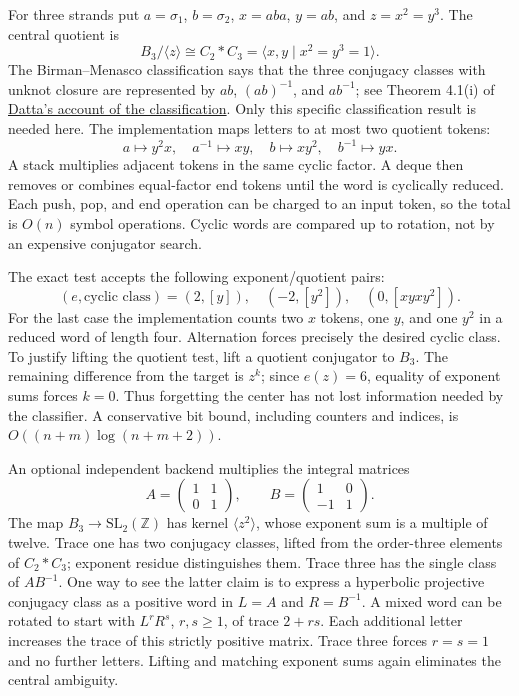 For three strands put $a=\sigma_1$, $b=\sigma_2$, $x=aba$, $y=ab$,
and $z=x^2=y^3$. The central quotient is
\[
 B_3/\langle z\rangle\cong C_2*C_3
   =\langle x,y\mid x^2=y^3=1\rangle.
\]
The Birman--Menasco classification says that the three conjugacy classes
with unknot closure are represented by $ab$, $(ab)^{-1}$, and $ab^{-1}$;
see Theorem 4.1(i) of
\href{https://arxiv.org/abs/2204.13660}{Datta's account of the classification}.
Only this specific classification result is needed here. The implementation
maps letters to at most two quotient tokens:
\[
 a\mapsto y^2x,\quad a^{-1}\mapsto xy,\quad
 b\mapsto xy^2,\quad b^{-1}\mapsto yx.
\]
A stack multiplies adjacent tokens in the same cyclic factor. A deque
then removes or combines equal-factor end tokens until the word is
cyclically reduced. Each push, pop, and end operation can be charged to
an input token, so the total is $O(n)$ symbol operations. Cyclic words
are compared up to rotation, not by an expensive conjugator search.

The exact test accepts the following exponent/quotient pairs:
\[
 (e,\text{cyclic class})=(2,[y]),\quad(-2,[y^2]),
 \quad(0,[xyxy^2]).
\]
For the last case the implementation counts two $x$ tokens, one $y$,
and one $y^2$ in a reduced word of length four. Alternation forces
precisely the desired cyclic class. To justify lifting the quotient
test, lift a quotient conjugator to $B_3$. The remaining difference
from the target is $z^k$; since $e(z)=6$, equality of exponent sums
forces $k=0$. Thus forgetting the center has not lost information
needed by the classifier. A conservative bit bound, including counters
and indices, is $O((n+m)\log(n+m+2))$.

An optional independent backend multiplies the integral matrices
\[
 A=\begin{pmatrix}1&1\\0&1\end{pmatrix},\qquad
 B=\begin{pmatrix}1&0\\-1&1\end{pmatrix}.
\]
The map $B_3\to\mathrm{SL}_2(\mathbb Z)$ has kernel
$\langle z^2\rangle$, whose exponent sum is a multiple of twelve.
Trace one has two conjugacy classes, lifted from the order-three
elements of $C_2*C_3$; exponent residue distinguishes them. Trace three
has the single class of $AB^{-1}$. One way to see the latter claim is
to express a hyperbolic projective conjugacy class as a positive word
in $L=A$ and $R=B^{-1}$. A mixed word can be rotated to start with
$L^rR^s$, $r,s\ge1$, of trace $2+rs$. Each additional letter increases
the trace of this strictly positive matrix. Trace three forces $r=s=1$
and no further letters. Lifting and matching exponent sums again
eliminates the central ambiguity.

